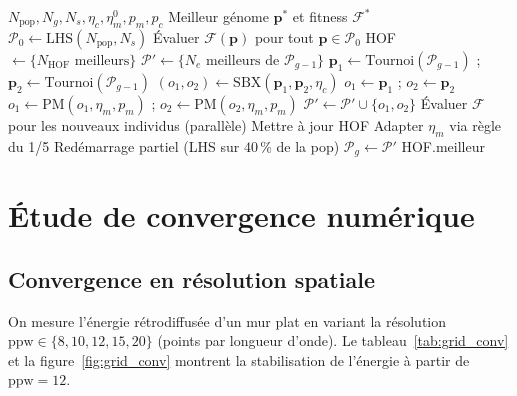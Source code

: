 \documentclass[12pt,a4paper]{article}
\numberwithin{equation}{section}
\numberwithin{figure}{section}
\numberwithin{table}{section}
\begin{document}
\begin{algorithm}[H]
\caption{Algorithme Génétique --- boucle principale}
\label{alg:GA}
\begin{algorithmic}[1]
\Input $N_{\text{pop}}, N_g, N_s, \eta_c, \eta_m^0, p_m, p_c$
\Output Meilleur génome $\bm{p}^*$ et fitness $\mathcal{F}^*$
\State $\mathcal{P}_0 \leftarrow \text{LHS}(N_{\text{pop}}, N_s)$ 
\State Évaluer $\mathcal{F}(\bm{p})$ pour tout $\bm{p} \in \mathcal{P}_0$
\State HOF $\leftarrow \{N_{\text{HOF}}\text{ meilleurs}\}$
    \State $\mathcal{P}' \leftarrow \{N_e\text{ meilleurs de }\mathcal{P}_{g-1}\}$ 
        \State $\bm{p}_1 \leftarrow \text{Tournoi}(\mathcal{P}_{g-1})$ ;
               $\bm{p}_2 \leftarrow \text{Tournoi}(\mathcal{P}_{g-1})$
            \State $(o_1, o_2) \leftarrow \text{SBX}(\bm{p}_1, \bm{p}_2, \eta_c)$
        \Else
            \State $o_1 \leftarrow \bm{p}_1$ ; $o_2 \leftarrow \bm{p}_2$
        \EndIf
        \State $o_1 \leftarrow \text{PM}(o_1, \eta_m, p_m)$ ;
               $o_2 \leftarrow \text{PM}(o_2, \eta_m, p_m)$
        \State $\mathcal{P}' \leftarrow \mathcal{P}' \cup \{o_1, o_2\}$
    \EndWhile
    \State Évaluer $\mathcal{F}$ pour les nouveaux individus (parallèle)
    \State Mettre à jour HOF
    \State Adapter $\eta_m$ via règle du 1/5
        \State Redémarrage partiel (LHS sur $40\,\%$ de la pop)
    \EndIf
    \State $\mathcal{P}_g \leftarrow \mathcal{P}'$
\EndFor
\State \Return HOF.meilleur
\end{algorithmic}
\end{algorithm}

\section{Étude de convergence numérique}

\subsection{Convergence en résolution spatiale}

On mesure l'énergie rétrodiffusée d'un mur plat en variant la résolution
$\text{ppw} \in \{8, 10, 12, 15, 20\}$ (points par longueur d'onde).
Le tableau~\ref{tab:grid_conv} et la figure~\ref{fig:grid_conv} montrent
la stabilisation de l'énergie à partir de $\text{ppw} = 12$.
\end{document}
